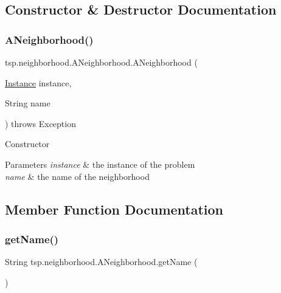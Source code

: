 \subsection{Constructor \& Destructor Documentation}
\mbox{\label{classtsp_1_1neighborhood_1_1_a_neighborhood_aec2c19f05baf76258fd83483b8637da2}} 
\subsubsection{\texorpdfstring{A\+Neighborhood()}{ANeighborhood()}}
{\footnotesize\ttfamily tsp.\+neighborhood.\+A\+Neighborhood.\+A\+Neighborhood (\begin{DoxyParamCaption}\item[{\mbox{\hyperlink{classtsp_1_1_instance}{Instance}}}]{instance,  }\item[{String}]{name }\end{DoxyParamCaption}) throws Exception\hspace{0.3cm}{\ttfamily [inline]}}

Constructor 
\begin{DoxyParams}{Parameters}
{\em instance} & the instance of the problem \\
\hline
{\em name} & the name of the neighborhood \\
\hline
\end{DoxyParams}


\subsection{Member Function Documentation}
\mbox{\label{classtsp_1_1neighborhood_1_1_a_neighborhood_a87ac72c2bdfadde28119eb996f92544e}} 
\subsubsection{\texorpdfstring{get\+Name()}{getName()}}
{\footnotesize\ttfamily String tsp.\+neighborhood.\+A\+Neighborhood.\+get\+Name (\begin{DoxyParamCaption}{ }\end{DoxyParamCaption})\hspace{0.3cm}{\ttfamily [inline]}}

